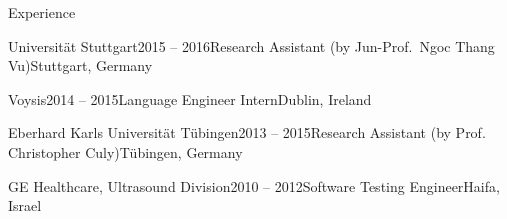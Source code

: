 \documentclass{resume} %
\begin{document}
\begin{rSection}{Experience}

\begin{rSubsection}{Universität Stuttgart}{2015 -- 2016}{Research Assistant (by Jun-Prof.\ Ngoc Thang Vu)}{Stuttgart, Germany}
	\setlength{\itemindent}{.7cm}
	
	\item[]%
	
	\item[]%
	\vspace{-1cm}
\end{rSubsection}

\begin{rSubsection}{Voysis}{2014 -- 2015}{Language Engineer Intern}{Dublin, Ireland}
	\setlength{\itemindent}{.7cm}
	
	\item[]%
	
	\item[]%
	\vspace{-1cm}
\end{rSubsection}

\begin{rSubsection}{Eberhard Karls Universität Tübingen}{2013 -- 2015}{Research Assistant (by Prof. Christopher Culy)}{Tübingen, Germany}
	\setlength{\itemindent}{.7cm}
	
	\item[]%
	
	\item[]%
	\vspace{-1cm}
\end{rSubsection}

\begin{rSubsection}{GE Healthcare, Ultrasound Division}{2010 -- 2012}{Software Testing Engineer}{Haifa, Israel}
	\setlength{\itemindent}{.7cm}
	
	\item[]%
	
	\item[]%
	\vspace{-1cm}
\end{rSubsection}


\end{rSection}
\end{document}
